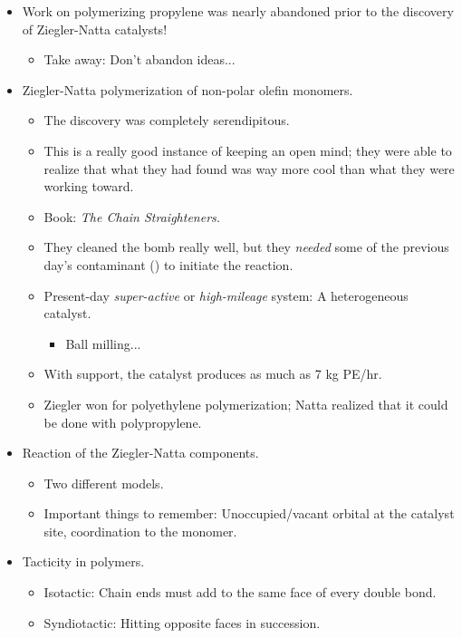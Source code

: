 \documentclass[../notes.tex]{subfiles}
\begin{document}
\begin{itemize}
\begin{enumerate}
    \end{enumerate}
    \item Work on polymerizing propylene was nearly abandoned prior to the discovery of Ziegler-Natta catalysts!
    \begin{itemize}
        \item Take away: Don't abandon ideas...
    \end{itemize}
    \item Ziegler-Natta polymerization of non-polar olefin monomers.
    \begin{itemize}
        \item The discovery was completely serendipitous.
        \item This is a really good instance of keeping an open mind; they were able to realize that what they had found was way more cool than what they were working toward.
        \item Book: \emph{The Chain Straighteners.}
        \item They cleaned the bomb really well, but they \emph{needed} some of the previous day's contaminant () to initiate the reaction.
        \item Present-day \emph{super-active} or \emph{high-mileage} system: A heterogeneous catalyst.
        \begin{itemize}
            \item Ball milling...
        \end{itemize}
        \item With  support, the catalyst produces as much as 7 kg PE/hr.
        \item Ziegler won for polyethylene polymerization; Natta realized that it could be done with polypropylene.
    \end{itemize}
    \item Reaction of the Ziegler-Natta components.
    \begin{itemize}
        \item Two different models.
        \item Important things to remember: Unoccupied/vacant orbital at the catalyst site, coordination to the monomer.
    \end{itemize}
    \item Tacticity in polymers.
    \begin{itemize}
        \item Isotactic: Chain ends must add to the same face of every double bond.
        \item Syndiotactic: Hitting opposite faces in succession.

\end{itemize}
\end{itemize}
\end{document}
